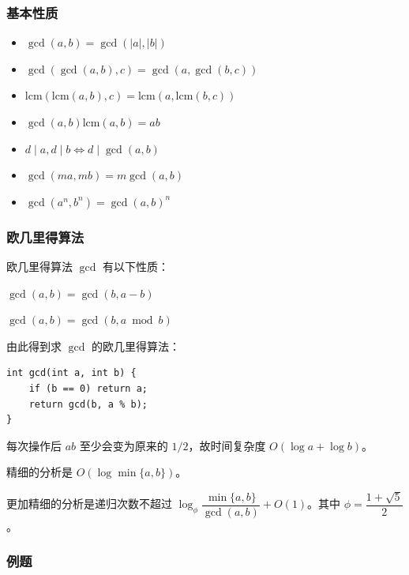 \documentclass[../main.tex]{subfiles}
\begin{document}
\subsubsection{基本性质}

\begin{frame}
\begin{itemize}
\item $\gcd(a,b)=\gcd(|a|,|b|)$ \pause
\item $\gcd(\gcd(a,b),c)=\gcd(a,\gcd(b,c))$ \pause
\item $\mathrm{lcm}(\mathrm{lcm}(a,b),c)=\mathrm{lcm}(a,\mathrm{lcm}(b,c))$ \pause
\item $\gcd(a,b)\mathrm{lcm}(a,b)=ab$ \pause
\item $d\mid a,d\mid b\iff d\mid\gcd(a,b)$ \pause
\item $\gcd(ma,mb)=m\gcd(a,b)$ \pause
\item $\gcd(a^n,b^n)=\gcd(a,b)^n$
\end{itemize}
\end{frame}

\subsubsection{欧几里得算法}

\begin{frame}[fragile]{欧几里得算法}
$\gcd$ 有以下性质：

$\gcd(a,b)=\gcd(b,a-b)$

$\gcd(a,b)=\gcd(b,a\bmod b)$ \pause

\bigskip
由此得到求 $\gcd$ 的欧几里得算法：
\begin{lstlisting}
int gcd(int a, int b) {
    if (b == 0) return a;
    return gcd(b, a % b);
}
\end{lstlisting}
\end{frame}

\begin{frame}
每次操作后 $ab$ 至少会变为原来的 $1/2$，故时间复杂度 $O(\log a+\log b)$。 \pause

精细的分析是 $O(\log\min\{a,b\})$。 \pause

更加精细的分析是递归次数不超过 $\log_{\phi}\dfrac{\min\{a,b\}}{\gcd(a,b)}+O(1)$。其中 $\phi=\dfrac{1+\sqrt{5}}{2}$。
\end{frame}

\subsubsection{例题}
\end{document}
